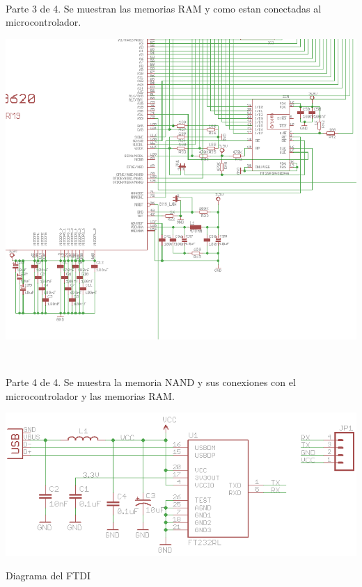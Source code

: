 \ 

Parte 3 de 4. Se muestran las memorias RAM y como estan conectadas
al microcontrolador.

\pagebreak{}

\includegraphics[scale=0.45]{appendix/samEsq4}

\ 

Parte 4 de 4. Se muestra la memoria NAND y sus conexiones con el microcontrolador
y las memorias RAM.

\pagebreak{}

\includegraphics[scale=0.8]{appendix/ftdiEsquematico}

Diagrama del FTDI
